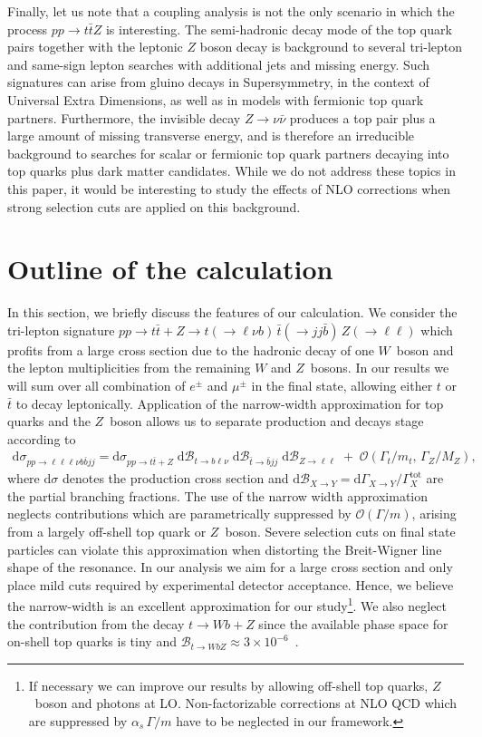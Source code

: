 \documentclass{JHEP3}
\newcommand{\mrm}{\mathrm}
\newcommand{\rd}{\mathrm{d}}
\newcommand{\Br}{\mathcal{B}}
\def\ttbZ{t\bar{t}Z}
\def\ttb{t\bar{t}}
\newcommand{\be}{\begin{eqnarray}}
\newcommand{\ee}{\end{eqnarray}}
\begin{document}
Finally, let us note that a coupling analysis is not the only scenario in which the process $pp\to\ttbZ$ is interesting. 
The semi-hadronic decay mode of the top quark pairs together with the leptonic $Z$ boson decay is background to several tri-lepton and same-sign lepton searches with additional jets and missing energy.
Such signatures can arise from gluino decays in Supersymmetry, in the context of Universal Extra Dimensions, as well as in models with fermionic top quark partners. 
Furthermore, the invisible decay $Z \to \nu \bar{\nu}$ produces a top pair plus a large amount of missing transverse energy, and is therefore an irreducible background 
to searches for scalar or fermionic top quark partners decaying into top quarks plus dark matter candidates.
While we do not address these topics in this paper, it would be interesting to study the effects of NLO corrections when strong selection cuts are applied on this background.


\section{Outline of the calculation}
In this section, we briefly discuss the features of our calculation.
We consider the tri-lepton signature  
$pp \to \ttb + Z \to t(\to \ell \nu b) \, \bar{t} (\to jj \bar{b}) \, Z(\to \ell \ell)$
which profits from a large cross section due to the hadronic decay of one $W$~boson and the lepton multiplicities from the remaining $W$ and $Z$~bosons.
In our results we will sum over all combination of $e^\pm$ and $\mu^\pm$ in the final state, allowing either $t$ or $\bar t$ to decay leptonically.
Application of the narrow-width approximation for top quarks and the $Z$~boson allows us to separate production and decays stage according to 
\be
  \rd \sigma_{pp\to\ell\ell\ell\nu b \bar{b} jj} = \rd \sigma_{pp\to\ttb+Z} \; \rd\Br_{t\to b \ell\nu} \; \rd\Br_{\bar{t} \to \bar{b} jj} \; \rd\Br_{Z\to \ell\ell}
  \;+\; \mathcal{O}(\Gamma_t/m_t, \, \Gamma_Z/M_Z)
  , \label{Xsec}
\ee
where $\rd \sigma$ denotes the production cross section and $\rd\Br_{X\to Y}= \rd \Gamma_{X\to Y} \big/ \Gamma^\mrm{tot}_X$ are the partial branching fractions.
The use of the narrow width approximation neglects contributions which are parametrically suppressed by $\mathcal{O}(\Gamma / m)$, arising from a largely off-shell top quark or $Z$~boson.
Severe selection cuts on final state particles can violate this approximation when distorting the Breit-Wigner line shape of the resonance.
In our analysis we aim for a large cross section and only place mild cuts required by experimental detector acceptance. 
Hence, we believe the narrow-width is an excellent approximation for our study\footnote{
If necessary we can improve our results by allowing off-shell top quarks, $Z$~boson and photons at LO.
Non-factorizable corrections at NLO QCD which are suppressed by $\alpha_s \, \Gamma/m$ have to be neglected in our framework.
}.
We also neglect the contribution from the decay $t \to Wb+Z$ since the available phase space for on-shell top quarks is tiny and 
$\Br_{t\to W bZ } \approx 3 \times 10^{-6}$~\cite{Altarelli:2000nt,Decker:1992wz,Mahlon:1994us,Jenkins:1996zd}.
\end{document}
